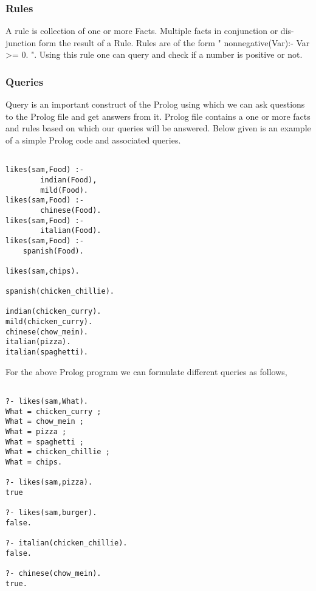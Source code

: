 \subsubsection{Rules}
A rule is collection of one or more Facts. Multiple facts in conjunction or dis-junction form the result of a Rule. Rules are of the form " nonnegative(Var):- Var >= 0. ". Using this rule one can query and check if a number is positive or not.

\subsubsection{Queries}
Query is an important construct of the Prolog using which we can ask questions to the Prolog file and get answers from it. Prolog  file contains a one or more facts and rules based on which our queries will be answered. \linebreak
Below given is an example of a simple Prolog code and associated queries.

\begin{minipage}{\linewidth}
\lstset{caption=Prolog Queries, captionpos=b, breaklines=true}       
\begin{lstlisting}[frame=single]

likes(sam,Food) :-
        indian(Food),
        mild(Food).
likes(sam,Food) :-
        chinese(Food).
likes(sam,Food) :-
        italian(Food).
likes(sam,Food) :-
	spanish(Food).

likes(sam,chips).

spanish(chicken_chillie).

indian(chicken_curry).
mild(chicken_curry).
chinese(chow_mein).
italian(pizza).
italian(spaghetti).

\end{lstlisting}
\end{minipage} 

For the above Prolog program we can formulate different queries as follows,

\begin{minipage}{\linewidth}
\lstset{caption=Prolog example, captionpos=b, breaklines=true}       
\begin{lstlisting}[frame=single]

?- likes(sam,What).
What = chicken_curry ;
What = chow_mein ;
What = pizza ;
What = spaghetti ;
What = chicken_chillie ;
What = chips.

?- likes(sam,pizza).
true

?- likes(sam,burger).
false.

?- italian(chicken_chillie).
false.

?- chinese(chow_mein).
true.

\end{lstlisting}
\end{minipage}

